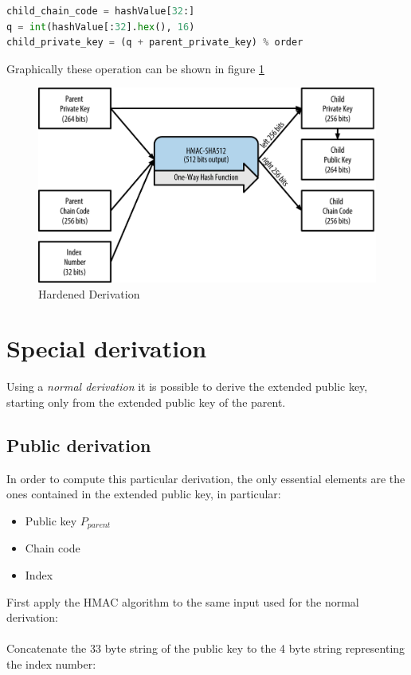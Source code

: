 \begin{lstlisting}[language=Python]
child_chain_code = hashValue[32:]
q = int(hashValue[:32].hex(), 16)
child_private_key = (q + parent_private_key) % order
\end{lstlisting}


\begin{flushleft}
	Graphically these operation can be shown in figure \ref{fig:hardened_derivation}
\end{flushleft}

\begin{figure}[ht!]
	\centering
	\includegraphics[width=15cm]{Figures/hardened_derivation.png}
	\caption{Hardened Derivation }
	\label{fig:hardened_derivation}
\end{figure}


\section{Special derivation}
Using a \textit{normal derivation} it is possible to derive the extended public key, starting only from the extended public key of the parent.

\subsection{Public derivation}

In order to compute this particular derivation, the only essential elements are the ones contained in the extended public key, in particular:

\begin{itemize}
	\item Public key $P_{parent}$
	\item Chain code
	\item Index
\end{itemize}
First apply the HMAC algorithm to the same input used for the normal derivation:
\\ \\
Concatenate the 33 byte string of the public key to the 4 byte string representing the index number:

